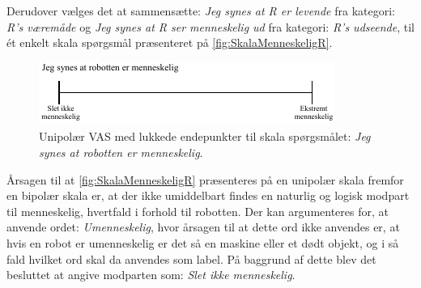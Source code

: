 Derudover vælges det at sammensætte: \textit{Jeg synes at R er levende} fra kategori: \textit{R's væremåde} og \textit{Jeg synes at R ser menneskelig ud} fra kategori: \textit{R's udseende}, til ét enkelt skala spørgsmål præsenteret på \autoref{fig:SkalaMenneskeligR}.
%
\begin{figure}[H]
\centering
\includegraphics[width =\textwidth]{Figure/UdvalgteSkalaer/MenneskeligR} 
\caption{Unipolær VAS med lukkede endepunkter til skala spørgsmålet: \textit{Jeg synes at robotten er menneskelig}.}
\label{fig:SkalaMenneskeligR}
\end{figure}
\noindent
%
Årsagen til at \autoref{fig:SkalaMenneskeligR} præsenteres på en unipolær skala fremfor en bipolær skala er, at der ikke umiddelbart findes en naturlig og logisk modpart til menneskelig, hvertfald i forhold til robotten. Der kan argumenteres for, at anvende ordet: \textit{Umenneskelig}, hvor årsagen til at dette ord ikke anvendes er, at hvis en robot er umenneskelig er det så en maskine eller et dødt objekt, og i så fald hvilket ord skal da anvendes som label. På baggrund af dette blev det besluttet at angive modparten som: \textit{Slet ikke menneskelig}.

